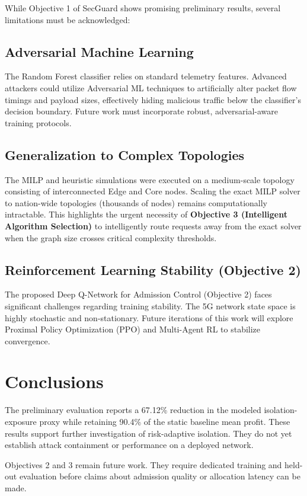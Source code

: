 While Objective 1 of SecGuard shows promising preliminary results, several limitations must be acknowledged:

\subsection{Adversarial Machine Learning}
The Random Forest classifier relies on standard telemetry features. Advanced attackers could utilize Adversarial ML techniques to artificially alter packet flow timings and payload sizes, effectively hiding malicious traffic below the classifier's decision boundary. Future work must incorporate robust, adversarial-aware training protocols.

\subsection{Generalization to Complex Topologies}
The MILP and heuristic simulations were executed on a medium-scale topology consisting of interconnected Edge and Core nodes. Scaling the exact MILP solver to nation-wide topologies (thousands of nodes) remains computationally intractable. This highlights the urgent necessity of \textbf{Objective 3 (Intelligent Algorithm Selection)} to intelligently route requests away from the exact solver when the graph size crosses critical complexity thresholds.

\subsection{Reinforcement Learning Stability (Objective 2)}
The proposed Deep Q-Network for Admission Control (Objective 2) faces significant challenges regarding training stability. The 5G network state space is highly stochastic and non-stationary. Future iterations of this work will explore Proximal Policy Optimization (PPO) and Multi-Agent RL to stabilize convergence.

\section{Conclusions}\label{sec:conclusions}
The preliminary evaluation reports a 67.12\% reduction in the modeled isolation-exposure proxy while retaining 90.4\% of the static baseline mean profit. These results support further investigation of risk-adaptive isolation. They do not yet establish attack containment or performance on a deployed network.

Objectives 2 and 3 remain future work. They require dedicated training and held-out evaluation before claims about admission quality or allocation latency can be made.
